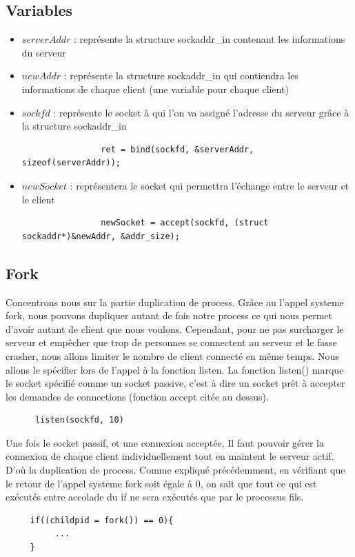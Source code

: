 \documentclass[a4paper,11pt]{report}
\begin{document}
\subsection{Variables}
\begin{itemize}
            \item $serverAddr$ : représente la structure sockaddr\_in contenant les informations du serveur
            \item $newAddr$ : représente la structure sockaddr\_in qui contiendra les informations de chaque client (une variable pour chaque client)
            \item $sockfd$ : représente le socket à qui l'on va assigné l'adresse du serveur grâce à la structure sockaddr\_in
            \begin{lstlisting} 
                ret = bind(sockfd, &serverAddr, sizeof(serverAddr));
            \end{lstlisting}
            \item $newSocket$ : représentera le socket qui permettra l'échange entre le serveur et le client
            \begin{lstlisting} 
                newSocket = accept(sockfd, (struct sockaddr*)&newAddr, &addr_size);
            \end{lstlisting}
\end{itemize}
\subsection{Fork}
Concentrons nous sur la partie duplication de process. Grâce au l'appel systeme fork, nous pouvons dupliquer autant de fois notre process ce qui nous permet d'avoir autant de client que nous voulons. Cependant, pour ne pas surcharger le serveur et empêcher que trop de personnes se connectent au serveur et le fasse crasher, nous allons limiter le nombre de client connecté en même temps. Nous allons le spécifier lors de l'appel à la fonction listen. La fonction listen() marque le socket spécifié comme un socket passive, c'est à dire un socket prêt à accepter les demandes de connections (fonction accept citée au dessus).
\begin{lstlisting} 
      listen(sockfd, 10)
\end{lstlisting}


Une fois le socket passif, et une connexion acceptée, Il faut pouvoir gérer la connexion de chaque client individuellement tout en maintent le serveur actif. 
D'où la duplication de process. 
Comme expliqué précédemment, en vérifiant que le retour de l'appel systeme fork soit égale à 0, on sait que tout ce qui est exécutés entre accolade du if ne sera exécutés que par le processus fils.
\begin{lstlisting} 
     if((childpid = fork()) == 0){
          ...
     }
\end{lstlisting}
\end{document}
